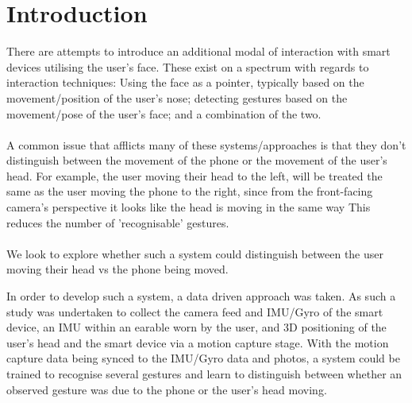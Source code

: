 \section{Introduction} %

There are attempts to introduce an additional modal of interaction with smart devices utilising the user's face.
These exist on a spectrum with regards to interaction techniques: Using the face as a pointer, typically based on the movement/position of the user's nose; detecting gestures based on the movement/pose of the user's face; and a combination of the two.
\\\\
A common issue that afflicts many of these systems/approaches is that they don't distinguish between the movement of the phone or the movement of the user's head. For example, the user moving their head to the left, will be treated the same as the user moving the phone to the right, since from the front-facing camera's perspective it looks like the head is moving in the same way%
This reduces the number of 'recognisable' gestures.
\\\\
We look to explore whether such a system could distinguish between the user moving their head vs the phone being moved. %

In order to develop such a system, a data driven approach was taken.
As such a study was undertaken to collect the camera feed and IMU/Gyro of the smart device, an IMU within an earable worn by the user, and 3D positioning of the user's head and the smart device via a motion capture stage.
With the motion capture data being synced to the IMU/Gyro data and photos, a system could be trained to recognise several gestures and learn to distinguish between whether an observed gesture was due to the phone or the user's head moving.






